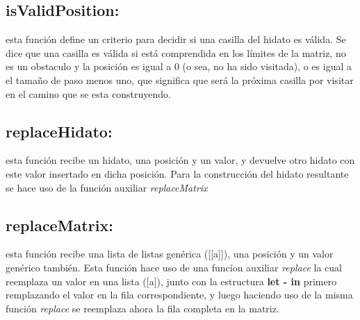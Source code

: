\documentclass[10pt]{amsart}
\begin{document}
    \subsection*{isValidPosition:} esta funci\'on define un criterio para decidir si una casilla del hidato es v\'alida. Se dice que una casilla es v\'alida si est\'a comprendida en los l\'imites de la matriz, no es un obstaculo y la posici\'on es igual a 0 (o sea, no ha sido visitada), o es igual a el tama\~no de paso menos uno, que significa que ser\'a la pr\'oxima casilla por visitar en el camino que se esta construyendo. 
        
    \subsection*{replaceHidato:} esta funci\'on recibe un hidato, una posici\'on y un valor, y devuelve otro hidato con este valor insertado en dicha posici\'on. Para la construcci\'on del hidato resultante se hace uso de la funci\'on auxiliar \textit{replaceMatrix}

    \subsection*{replaceMatrix:} esta funci\'on recibe una lista de listas gen\'erica ([[a]]), una posici\'on y un valor gen\'erico tambi\'en. Esta funci\'on hace uso de una func\'ion auxiliar \textit{replace} la cual reemplaza un valor en una lista ([a]), junto con la estructura \textbf{let - in} primero remplazando el valor en la fila correspondiente, y luego haciendo uso de la misma funci\'on \textit{replace} se reemplaza ahora la fila completa en la matriz.     
    
\end{document}
